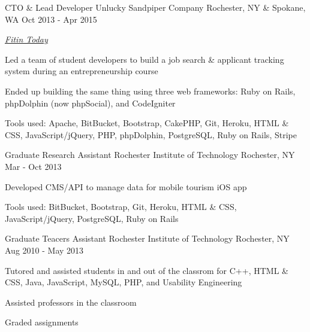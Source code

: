\begin{cventries}
  \cventry
    {CTO \& Lead Developer} %
    {Unlucky Sandpiper Company} %
    {Rochester, NY \& Spokane, WA} %
    {Oct 2013 - Apr 2015} %
    {
      \begin{cvitems} %
      \item {\emph{\href{https://angel.co/fitiin-today/}{Fitin Today}}}
        \item {Led a team of student developers to build a job search \& applicant tracking system during an entrepreneurship course}
        \item {Ended up building the same thing using three web frameworks: Ruby on Rails, phpDolphin (now phpSocial), and CodeIgniter}
        \item {Tools used: Apache, BitBucket, Bootstrap, CakePHP, Git, Heroku, HTML \& CSS, JavaScript/jQuery, PHP, phpDolphin, PostgreSQL, Ruby on Rails, Stripe}
      \end{cvitems}
    }

  \cventry
    {Graduate Research Assistant} %
    {Rochester Institute of Technology} %
    {Rochester, NY} %
    {Mar - Oct 2013} %
    {
      \begin{cvitems} %
        \item {Developed CMS/API to manage data for mobile tourism iOS app}
        \item {Tools used: BitBucket, Bootstrap, Git, Heroku, HTML \& CSS, JavaScript/jQuery, PostgreSQL, Ruby on Rails}
      \end{cvitems}
    }

  \cventry
    {Graduate Teacers Assistant}
    {Rochester Institute of Technology}
    {Rochester, NY}
    {Aug 2010 - May 2013}
    {
      \begin{cvitems}
        \item {Tutored and assisted students in and out of the classrom for C++, HTML \& CSS, Java, JavaScript, MySQL, PHP, and Usability Engineering}
        \item {Assisted professors in the classroom}
        \item {Graded assignments}
     \end{cvitems}
   }


\end{cventries}
